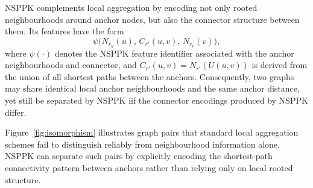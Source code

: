 NSPPK complements local aggregation by encoding not only rooted neighbourhoods
around anchor nodes, but also the connector structure between them. Its
features have the form
\[
\psi\bigl(N_{r_u}(u),\,C_{r'}(u,v),\,N_{r_v}(v)\bigr),
\]
where $\psi(\cdot)$ denotes the NSPPK feature identifier associated with the
anchor neighbourhoods and connector, and
$C_{r'}(u,v)=N_{r'}(U(u,v))$ is derived from the union of all shortest paths
between the anchors. Consequently, two graphs may share identical local anchor
neighbourhoods and the same anchor distance, yet still be separated by NSPPK iif the connector encodings produced by NSPPK differ.

Figure~\ref{fig:isomorphism} illustrates graph pairs that standard local
aggregation schemes fail to distinguish reliably from neighbourhood information
alone. NSPPK can separate such pairs by explicitly encoding the shortest-path
connectivity pattern between anchors rather than relying only on local rooted
structure.
